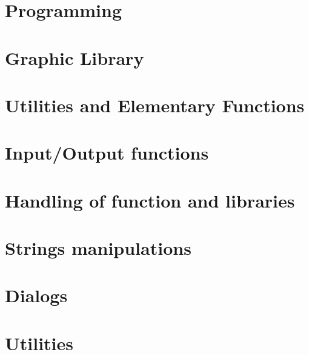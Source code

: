              \textheight=660pt 
             \textwidth=15cm
             \topmargin=-27pt 
             \oddsidemargin=0.7cm
             \evensidemargin=0.7cm
             \marginparwidth=60pt
\def\vector#1{\left( \begin{array}{c} #1  \end{array}\right)}
\def\matrixq#1{\left( \begin{array}{cc} #1  \end{array}\right)}

\makeindex 







\chapter{Programming}
         
\chapter{Graphic Library }
         
\chapter{Utilities and Elementary Functions}
         
\chapter{Input/Output functions}
         
\chapter{Handling of function and libraries}
        
\chapter{Strings manipulations}
        
\chapter{Dialogs}
        
\chapter{Utilities}
        
